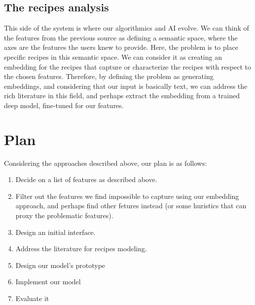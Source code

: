 \documentclass[]{article}
\begin{document}
\subsection{The recipes analysis}
This side of the system is where our algorithmics and AI evolve. We can think of the features from the previous source as defining a semantic space, where the axes are the features the users knew to provide. Here, the problem is to place specific recipes in this semantic space. We can consider it as creating an embedding for the recipes that capture or characterize the recipes with respect to the chosen features. Therefore, by defining the problem as generating embeddings, and considering that our input is basically text, we can address the rich literature in this field, and perhaps extract the embedding from a trained deep model, fine-tuned for our features.

\section{Plan}
Considering the approaches described above, our plan is as follows:
\begin{enumerate}
	\item Decide on a list of features as described above.
	\item Filter out the features we find impossible to capture using our embedding approach, and perhaps find other fetures instead (or some huristics that can proxy the problematic features).
	\item Design an initial interface.
	\item Address the literature for recipes modeling.
	\item Design our model's prototype
	\item Implement our model
	\item Evaluate it
\end{enumerate}



\end{document}
